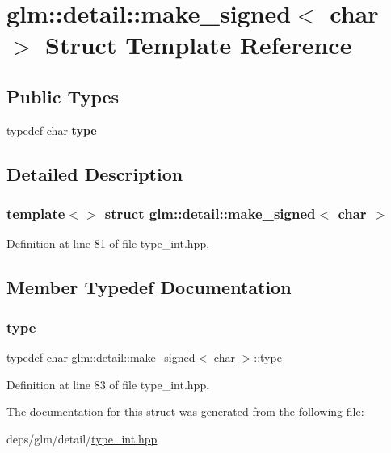 \hypertarget{structglm_1_1detail_1_1make__signed_3_01char_01_4}{}\section{glm\+:\+:detail\+:\+:make\+\_\+signed$<$ char $>$ Struct Template Reference}
\label{structglm_1_1detail_1_1make__signed_3_01char_01_4}
\subsection*{Public Types}
\begin{DoxyCompactItemize}
\item 
\mbox{\label{structglm_1_1detail_1_1make__signed_3_01char_01_4_ad92111512e0af83393df0905896d478f}} 
typedef \hyperlink{classchar}{char} {\bfseries type}
\end{DoxyCompactItemize}


\subsection{Detailed Description}
\subsubsection*{template$<$$>$\newline
struct glm\+::detail\+::make\+\_\+signed$<$ char $>$}



Definition at line 81 of file type\+\_\+int.\+hpp.



\subsection{Member Typedef Documentation}
\mbox{\label{structglm_1_1detail_1_1make__signed_3_01char_01_4_ad92111512e0af83393df0905896d478f}} 
\subsubsection{\texorpdfstring{type}{type}}
{\footnotesize\ttfamily typedef \hyperlink{classchar}{char} \hyperlink{structglm_1_1detail_1_1make__signed}{glm\+::detail\+::make\+\_\+signed}$<$ \hyperlink{classchar}{char} $>$\+::\hyperlink{classchar}{type}}



Definition at line 83 of file type\+\_\+int.\+hpp.



The documentation for this struct was generated from the following file\+:\begin{DoxyCompactItemize}
\item 
deps/glm/detail/\hyperlink{type__int_8hpp}{type\+\_\+int.\+hpp}\end{DoxyCompactItemize}
